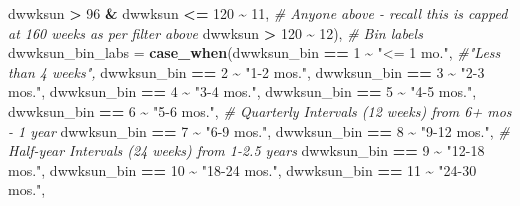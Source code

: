 \documentclass[
]{article}
\newenvironment{Shaded}{\begin{snugshade}}{\end{snugshade}}
\newcommand{\AttributeTok}[1]{\textcolor[rgb]{0.13,0.29,0.53}{#1}}
\newcommand{\CommentTok}[1]{\textcolor[rgb]{0.56,0.35,0.01}{\textit{#1}}}
\newcommand{\DecValTok}[1]{\textcolor[rgb]{0.00,0.00,0.81}{#1}}
\newcommand{\FunctionTok}[1]{\textcolor[rgb]{0.13,0.29,0.53}{\textbf{#1}}}
\newcommand{\NormalTok}[1]{#1}
\newcommand{\SpecialCharTok}[1]{\textcolor[rgb]{0.81,0.36,0.00}{\textbf{#1}}}
\newcommand{\StringTok}[1]{\textcolor[rgb]{0.31,0.60,0.02}{#1}}
\begin{document}
\begin{Shaded}
\begin{Highlighting}[]
\NormalTok{                                 dwwksun }\SpecialCharTok{\textgreater{}} \DecValTok{96} \SpecialCharTok{\&}\NormalTok{ dwwksun }\SpecialCharTok{\textless{}=} \DecValTok{120} \SpecialCharTok{\textasciitilde{}} \DecValTok{11}\NormalTok{, }
                                 \CommentTok{\# Anyone above {-} recall this is capped at 160 weeks as per filter above}
\NormalTok{                                 dwwksun }\SpecialCharTok{\textgreater{}} \DecValTok{120} \SpecialCharTok{\textasciitilde{}} \DecValTok{12}\NormalTok{),}
         \CommentTok{\# Bin labels}
         \AttributeTok{dwwksun\_bin\_labs =} \FunctionTok{case\_when}\NormalTok{(dwwksun\_bin }\SpecialCharTok{==} \DecValTok{1} \SpecialCharTok{\textasciitilde{}} \StringTok{"\textless{}= 1 mo."}\NormalTok{, }\CommentTok{\#"Less than 4 weeks",}
\NormalTok{                                 dwwksun\_bin }\SpecialCharTok{==} \DecValTok{2} \SpecialCharTok{\textasciitilde{}} \StringTok{"1{-}2 mos."}\NormalTok{,}
\NormalTok{                                 dwwksun\_bin }\SpecialCharTok{==} \DecValTok{3} \SpecialCharTok{\textasciitilde{}} \StringTok{"2{-}3 mos."}\NormalTok{,}
\NormalTok{                                 dwwksun\_bin }\SpecialCharTok{==} \DecValTok{4} \SpecialCharTok{\textasciitilde{}} \StringTok{"3{-}4 mos."}\NormalTok{, }
\NormalTok{                                 dwwksun\_bin }\SpecialCharTok{==} \DecValTok{5} \SpecialCharTok{\textasciitilde{}} \StringTok{"4{-}5 mos."}\NormalTok{,}
\NormalTok{                                 dwwksun\_bin }\SpecialCharTok{==} \DecValTok{6} \SpecialCharTok{\textasciitilde{}} \StringTok{"5{-}6 mos."}\NormalTok{,}
                                 \CommentTok{\# Quarterly Intervals (12 weeks) from 6+ mos {-} 1 year}
\NormalTok{                                 dwwksun\_bin }\SpecialCharTok{==} \DecValTok{7} \SpecialCharTok{\textasciitilde{}} \StringTok{"6{-}9 mos."}\NormalTok{,}
\NormalTok{                                 dwwksun\_bin }\SpecialCharTok{==} \DecValTok{8} \SpecialCharTok{\textasciitilde{}} \StringTok{"9{-}12 mos."}\NormalTok{, }
                                 \CommentTok{\# Half{-}year Intervals (24 weeks) from 1{-}2.5 years}
\NormalTok{                                 dwwksun\_bin }\SpecialCharTok{==} \DecValTok{9} \SpecialCharTok{\textasciitilde{}} \StringTok{"12{-}18 mos."}\NormalTok{, }
\NormalTok{                                 dwwksun\_bin }\SpecialCharTok{==} \DecValTok{10} \SpecialCharTok{\textasciitilde{}} \StringTok{"18{-}24 mos."}\NormalTok{, }
\NormalTok{                                 dwwksun\_bin }\SpecialCharTok{==} \DecValTok{11} \SpecialCharTok{\textasciitilde{}} \StringTok{"24{-}30 mos."}\NormalTok{, }

\end{Highlighting}
\end{Shaded}
\end{document}

